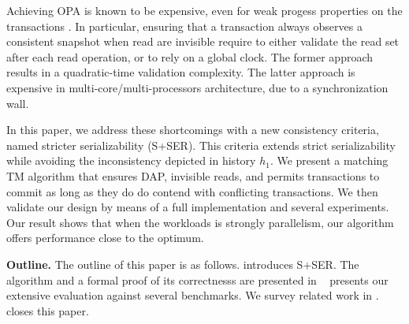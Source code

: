 Achieving OPA is known to be expensive, even for weak progess properties on the transactions \cite{}.
In particular, ensuring that a transaction always observes a consistent snapshot when read are invisible require to either validate the read set after each read operation, or to rely on a global clock.
The former approach results in a quadratic-time validation complexity.
The latter approach is expensive in multi-core/multi-processors architecture, due to a synchronization wall.

In this paper, we address these shortcomings with a new consistency criteria, named stricter serializability (S+SER).
This criteria extends strict serializability while avoiding the inconsistency depicted in history $h_1$.
We present a matching TM algorithm that ensures DAP, invisible reads, and permits transactions to commit as long as they do do contend with conflicting transactions.
We then validate our design by means of a full implementation and several experiments.
Our result shows that when the workloads is strongly parallelism, our algorithm offers performance close to the optimum.

\textbf{Outline.}
The outline of this paper is as follows.
 introduces S+SER.
The algorithm and a formal proof of its correctnesss are presented in ~
 presents our extensive evaluation against several benchmarks.
We survey related work in .
 closes this paper.
